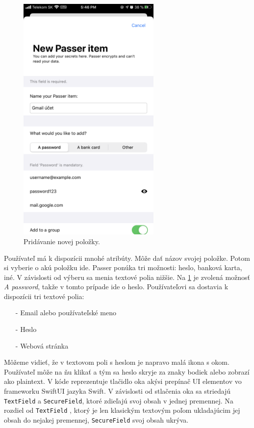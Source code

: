 \begin{figure}[H]
  \centering
  \includegraphics[width=7cm]{img/passer2.PNG}
  \caption{Pridávanie novej položky.}
  \label{passer2}
\end{figure}

Používateľ má k dispozícii mnohé atribúty. Môže dať názov svojej položke. Potom si vyberie o akú položku ide. Passer ponúka tri možnosti: heslo, banková karta, iné. V závislosti od výberu sa menia textové polia nižšie. Na \figurename{ \ref{passer2}} je zvolená možnosť \textit{A password}, takže v tomto prípade ide o heslo. Používateľovi sa dostavia k dispozícii tri textové polia:
\begin{itemize}
    \item[-] Email alebo používateľské meno
    \item[-] Heslo
    \item[-] Webová stránka
\end{itemize}

Môžeme vidieť, že v textovom poli s heslom je napravo malá ikona s okom. Používateľ môže na ňu klikať a tým sa heslo skryje za znaky bodiek alebo zobrazí ako plaintext. V kóde reprezentuje tlačidlo oka akýsi prepínač UI elementov vo frameworku SwiftUI jazyka Swift. V závislosti od stlačenia oka sa striedajú \texttt{TextField} a \texttt{SecureField}, ktoré zdieľajú svoj obsah v jednej premennej. Na rozdiel od \texttt{TextField} \cite{textfield_swiftui}, ktorý je len klasickým textovým poľom ukladajúcim jej obsah do nejakej premennej, \texttt{SecureField} \cite{securefield_swiftui} svoj obsah ukrýva.

